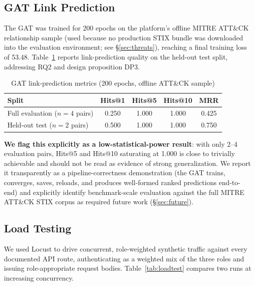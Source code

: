 \documentclass[conference]{IEEEtran}
\begin{document}
\subsection{GAT Link Prediction}
The GAT was trained for 200 epochs on the platform's offline MITRE ATT\&CK relationship sample (used because no production STIX bundle was downloaded into the evaluation environment; see \S\ref{sec:threats}), reaching a final training loss of 53.48. Table~\ref{tab:gat} reports link-prediction quality on the held-out test split, addressing RQ2 and design proposition DP3.

\begin{table}[h]
\caption{GAT link-prediction metrics (200 epochs, offline ATT\&CK sample)}
\label{tab:gat}
\centering
\begin{tabular}{@{}lcccc@{}}
\toprule
\textbf{Split} & \textbf{Hits@1} & \textbf{Hits@5} & \textbf{Hits@10} & \textbf{MRR} \\
\midrule
Full evaluation ($n=4$ pairs) & 0.250 & 1.000 & 1.000 & 0.425 \\
Held-out test ($n=2$ pairs) & 0.500 & 1.000 & 1.000 & 0.750 \\
\bottomrule
\end{tabular}
\end{table}

\textbf{We flag this explicitly as a low-statistical-power result}: with only 2--4 evaluation pairs, Hits@5 and Hits@10 saturating at 1.000 is close to trivially achievable and should not be read as evidence of strong generalization. We report it transparently as a pipeline-correctness demonstration (the GAT trains, converges, saves, reloads, and produces well-formed ranked predictions end-to-end) and explicitly identify benchmark-scale evaluation against the full MITRE ATT\&CK STIX corpus as required future work (\S\ref{sec:future}).

\subsection{Load Testing}
\label{sec:loadtest}
We used Locust to drive concurrent, role-weighted synthetic traffic against every documented API route, authenticating as a weighted mix of the three roles and issuing role-appropriate request bodies. Table~\ref{tab:loadtest} compares two runs at increasing concurrency.
\end{document}
